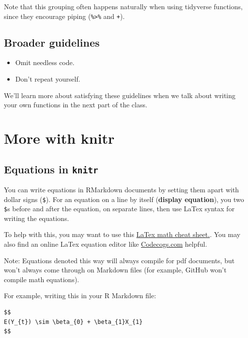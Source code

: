 \documentclass[]{book}
\providecommand{\tightlist}{%
  \setlength{\itemsep}{0pt}\setlength{\parskip}{0pt}}
\theoremstyle{definition}
\theoremstyle{definition}
\theoremstyle{definition}
\theoremstyle{remark}
\begin{document}
Note that this grouping often happens naturally when using tidyverse
functions, since they encourage piping (\texttt{\%\textgreater{}\%} and
\texttt{+}).

\subsection{Broader guidelines}\label{broader-guidelines}

\begin{itemize}
\tightlist
\item
  Omit needless code.
\item
  Don't repeat yourself.
\end{itemize}

We'll learn more about satisfying these guidelines when we talk about
writing your own functions in the next part of the class.

\section{More with knitr}\label{more-with-knitr}

\subsection{\texorpdfstring{Equations in
\texttt{knitr}}{Equations in knitr}}\label{equations-in-knitr}

You can write equations in RMarkdown documents by setting them apart
with dollar signs (\texttt{\$}). For an equation on a line by itself
(\textbf{display equation}), you two \texttt{\$}s before and after the
equation, on separate lines, then use LaTex syntax for writing the
equations.

To help with this, you may want to use this
\href{http://reu.dimacs.rutgers.edu/Symbols.pdf}{LaTex math cheat
sheet.}. You may also find an online LaTex equation editor like
\href{https://www.codecogs.com/latex/eqneditor.php}{Codecogs.com}
helpful.

Note: Equations denoted this way will always compile for pdf documents,
but won't always come through on Markdown files (for example, GitHub
won't compile math equations).

For example, writing this in your R Markdown file:

\begin{verbatim}
$$
E(Y_{t}) \sim \beta_{0} + \beta_{1}X_{1}
$$
\end{verbatim}
\end{document}
